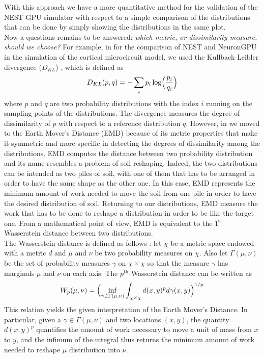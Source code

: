 \documentclass[a4paper, 12pt, twoside, openright]{book}
\begin{document}
With this approach we have a more quantitative method for the validation of the NEST GPU simulator with respect to a simple comparison of the distributions that can be done by simply showing the distributions in the same plot.\\
Now a questions remains to be answered: \textit{which metric, or dissimilarity measure, should we choose?}
For example, in \cite{Golosio2021} for the comparison of NEST and NeuronGPU in the simulation of the cortical microcircuit model, we used the Kullback-Leibler divergence ($D_{KL}$) \cite{Kullback1951}, which is defined as
\begin{equation}
    D_{KL} (p,q) = - \sum_i p_i\log\Bigl( \dfrac{p_i}{q_i} \Bigr)
\end{equation}
where $p$ and $q$ are two probability distributions with the index $i$ running on the sampling points of the distributions. The divergence measures the degree of dissimilarity of $p$ with respect to a reference distribution $q$. However, in \cite{Tiddia2022} we moved to the Earth Mover's Distance (EMD) because of its metric properties that make it symmetric and more specific in detecting the degrees of dissimilarity among the distributions. EMD computes the distance between two probability distribution and its name resembles a problem of soil reshaping. Indeed, the two distributions can be intended as two piles of soil, with one of them that has to be arranged in order to have the same shape as the other one. In this case, EMD represents the minimum amount of work needed to move the soil from one pile in order to have the desired distribution of soil. Returning to our distributions, EMD measure the work that has to be done to reshape a distribution in order to be like the target one. From a mathematical point of view, EMD is equivalent to the $1^{\mathrm{st}}$ Wasserstein distance between two distributions.\\
The Wasserstein distance is defined as follows \cite{Panaretos_Zemel, Frohmader_Volkmer}: let $\chi$ be a metric space endowed with a metric $d$ and $\mu$ and $\nu$ be two probability measures on $\chi$. Also let $\Gamma (\mu, \nu)$ be the set of probability measures $\gamma$ on $\chi \times \chi$ so that the measure $\gamma$ has marginals $\mu$ and $\nu$ on each axis. The $p^{\mathrm{th}}$-Wasserstein distance can be written as
\begin{equation}
    \label{eq:p-Wasserstein}
    W_p (\mu, \nu)=\Bigl( \inf_{\gamma \in \Gamma (\mu, \nu)} \int_{\chi \times \chi} d(x,y)^p d\gamma (x,y) \Bigr)^{1/p}
\end{equation}
This relation yields the given interpretation of the Earth Mover's Distance. In particular, given a $\gamma \in \Gamma (\mu , \nu)$ and two locations $(x,y)$, the quantity $d(x,y)^p$ quantifies the amount of work necessary to move a unit of mass from $x$ to $y$, and the infimum of the integral thus returns the minimum amount of work needed to reshape $\mu$ distribution into $\nu$.
\end{document}
